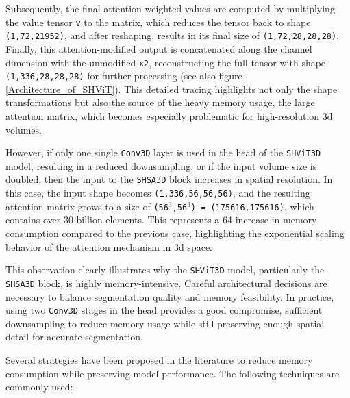 \medskip

Subsequently, the final attention-weighted values are computed by multiplying the value tensor {\tt v} to the matrix, which reduces the tensor back to shape {\tt (1,72,21952)}, and after reshaping, results in its final size of {\tt (1,72,28,28,28)}. Finally, this attention-modified output is concatenated along the channel dimension with the unmodified {\tt x2}, reconstructing the full tensor with shape {\tt (1,336,28,28,28)} for further processing (see also figure \ref{Architecture_of_SHViT}). This detailed tracing highlights not only the shape transformations but also the source of the heavy memory usage, the large attention matrix, which becomes especially problematic for high-resolution \gls{3d} volumes.

\medskip

However, if only one single {\tt Conv3D} layer is used in the head of the {\tt SHViT3D} model, resulting in a reduced downsampling, or if the input volume size is doubled, then the input to the {\tt SHSA3D} block increases in spatial resolution. In this case, the input shape becomes {\tt (1,336,56,56,56)}, and the resulting attention matrix grows to a size of {\tt ({56$^3$},{56$^3$}) = (175616,175616)}, which contains over 30 billion elements. This represents a 64 increase in memory consumption compared to the previous case, highlighting the exponential scaling behavior of the attention mechanism in \gls{3d} space.

\medskip

This observation clearly illustrates why the {\tt SHViT3D} model, particularly the {\tt SHSA3D} block, is highly memory-intensive. Careful architectural decisions are necessary to balance segmentation quality and memory feasibility. In practice, using two {\tt Conv3D} stages in the head provides a good compromise, sufficient downsampling to reduce memory usage while still preserving enough spatial detail for accurate segmentation.

\bigskip

Several strategies have been proposed in the literature to reduce memory consumption while preserving model performance. The following techniques are commonly used:

